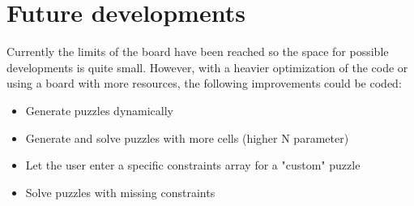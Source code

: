 \documentclass[12pt]{report}
\begin{document}
\section*{Future developments}

Currently the limits of the board have been reached so the space for
possible developments is quite small. However, with a heavier optimization
of the code or using a board with more resources, the following improvements
could be coded:

\begin{itemize}

    \item Generate puzzles dynamically
    \item Generate and solve puzzles with more cells (higher N parameter)
    \item Let the user enter a specific constraints array for a "custom" puzzle
    \item Solve puzzles with missing constraints

\end{itemize}
\end{document}
